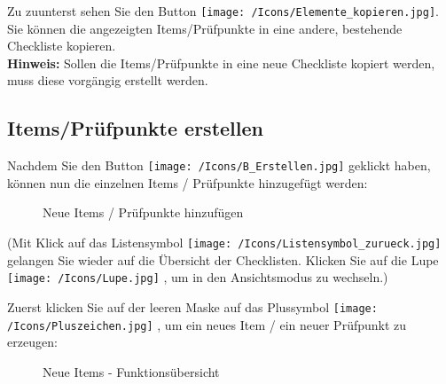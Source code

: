 Zu zuunterst sehen Sie den Button \texttt{[image: /Icons/Elemente\_kopieren.jpg]}. Sie können die angezeigten Items/Prüfpunkte in eine andere, bestehende Checkliste kopieren.\\
\textbf{Hinweis:} Sollen die Items/Prüfpunkte in eine neue Checkliste kopiert werden, muss diese vorgängig erstellt werden.

\subsection{Items/Prüfpunkte erstellen}

Nachdem Sie den Button \texttt{[image: /Icons/B\_Erstellen.jpg]} geklickt haben, können nun die einzelnen Items / Prüfpunkte hinzugefügt werden:

\begin{figure}[H]
\caption{Neue Items / Prüfpunkte hinzufügen}
\end{figure}

(Mit Klick auf das Listensymbol \texttt{[image: /Icons/Listensymbol\_zurueck.jpg]}  gelangen Sie wieder auf die Übersicht der Checklisten. Klicken Sie auf die Lupe \texttt{[image: /Icons/Lupe.jpg]} , um in den Ansichtsmodus zu wechseln.)

\vspace{\baselineskip}

Zuerst klicken Sie auf der leeren Maske auf das Plussymbol \texttt{[image: /Icons/Pluszeichen.jpg]} , um ein neues Item / ein neuer Prüfpunkt zu erzeugen:

\pagebreak

\begin{figure}[H]
\caption{Neue Items - Funktionsübersicht}
\end{figure}

